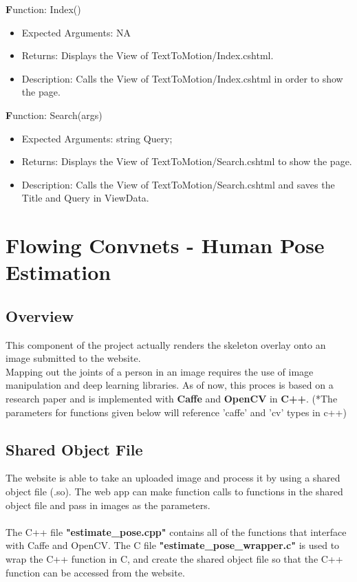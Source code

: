 \documentclass{scrreprt}
\begin{document}
  \textbf Function: Index()
  \begin{itemize}
    \item Expected Arguments:
    NA
    \item Returns:
    Displays the View of TextToMotion/Index.cshtml.
    \item Description:
    Calls the View of TextToMotion/Index.cshtml in order to show the page.
  \end{itemize}

  \textbf Function: Search(args)
  \begin{itemize}
    \item Expected Arguments:
    string Query;
    \item Returns:
    Displays the View of TextToMotion/Search.cshtml to show the page.
    \item Description:
    Calls the View of TextToMotion/Search.cshtml and saves the Title and Query in ViewData.
  \end{itemize}
  
\break


\section{Flowing Convnets - Human Pose Estimation}

\subsection{Overview}

This component of the project actually renders the skeleton overlay onto an image submitted to the website.
\\
Mapping out the joints of a person in an image requires the use of image manipulation and deep learning libraries. As of now, this proces is based on a research paper and is implemented with \textbf{Caffe} and \textbf{OpenCV} in \textbf{C++}. (*The parameters for functions given below will reference 'caffe' and 'cv' types in c++)



\subsection{Shared Object File}

The website is able to take an uploaded image and process it by using a shared object file (.so). The web app can make function calls to functions in the shared object file and pass in images as the parameters.
\\\\
The C++ file \textbf{"estimate\_pose.cpp"} contains all of the functions that interface with Caffe and OpenCV. The C file \textbf{"estimate\_pose\_wrapper.c"} is used to wrap the C++ function in C, and create the shared object file so that the C++ function can be accessed from the website.
\end{document}
